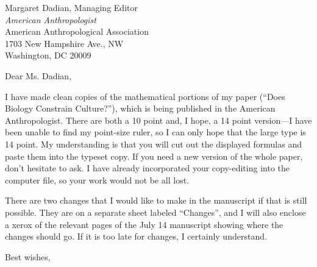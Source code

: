 \address{Department of Anthropology\\
University of Utah\\
Salt Lake City, UT 84112\\
USA}
\signature{Alan Rogers\\Assistant Professor}

\begin{letter}{Margaret Dadian, Managing Editor\\
{\em American Anthropologist}\\
American Anthropological Association\\
1703 New Hampshire Ave., NW\\
Washington, DC 20009}
\opening{Dear Ms. Dadian,}
I have made clean copies of the mathematical portions of my paper (``Does
Biology Constrain Culture?''), which is being published in the American
Anthropologist.  There are both a 10 point and, I hope, a 14 point
version---I have been unable to find my point-size ruler, so I can only
hope that the large type is 14 point.  My understanding is that you will
cut out the displayed formulas and paste them into the typeset copy.  If
you need a new version of the whole paper, don't hesitate to ask.  I have
already incorporated your copy-editing into the computer file, so your
work would not be all lost.

There are two changes that I would like to make in the manuscript
if that is still possible.  They are on a separate sheet labeled
``Changes'', and I will also enclose a xerox of the relevant pages of the
July 14 manuscript showing where the changes should go.  If it is too late
for changes, I certainly understand.

\closing{Best wishes,}
\end{letter}

